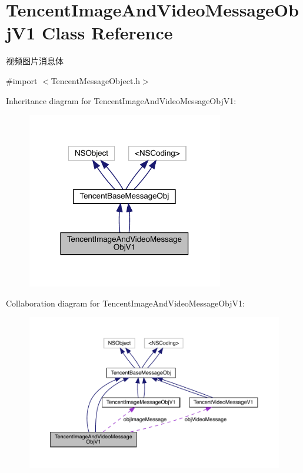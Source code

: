 \hypertarget{interface_tencent_image_and_video_message_obj_v1}{}\section{Tencent\+Image\+And\+Video\+Message\+Obj\+V1 Class Reference}
\label{interface_tencent_image_and_video_message_obj_v1}


视频图片消息体  




{\ttfamily \#import $<$Tencent\+Message\+Object.\+h$>$}



Inheritance diagram for Tencent\+Image\+And\+Video\+Message\+Obj\+V1\+:\nopagebreak
\begin{figure}[H]
\begin{center}
\leavevmode
\includegraphics[width=243pt]{interface_tencent_image_and_video_message_obj_v1__inherit__graph}
\end{center}
\end{figure}


Collaboration diagram for Tencent\+Image\+And\+Video\+Message\+Obj\+V1\+:\nopagebreak
\begin{figure}[H]
\begin{center}
\leavevmode
\includegraphics[width=350pt]{interface_tencent_image_and_video_message_obj_v1__coll__graph}
\end{center}
\end{figure}
